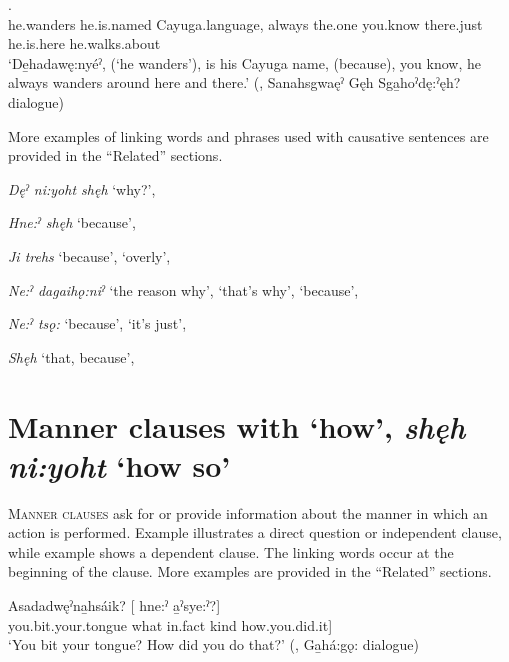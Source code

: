 \ea\label{ex:trehssuborex11} 
.\\
he.wanders he.is.named Cayuga.language, always the.one you.know there.just he.is.here he.walks.about\\
\glt ‘De̱hadawę:nyéˀ, (‘he wanders’), is his Cayuga name, (because), you know, he always wanders around here and there.’ (\cite[317]{mithun_watewayestanih_1984}, Sanahsgwaęˀ Gęh Sga̱hoˀdę:ˀęh? dialogue)
\z

More examples of linking words and phrases used with causative sentences are provided in the “Related” sections.

\begin{CayugaRelated}
\item{}\textit{Dęˀ ni:yoht shęh} ‘why?’, 

\item{}\textit{Hne:ˀ shęh} ‘because’, 

\item{}\textit{Ji trehs} ‘because’, ‘overly’, 

\item{}\textit{Ne:ˀ dagaihǫ:niˀ} ‘the reason why’, ‘that’s why’, ‘because’, 

\item{}\textit{Ne:ˀ tsǫ:} ‘because’, ‘it’s just’, 

\item{}\textit{Shęh} ‘that, because’, 
\end{CayugaRelated}


\section{Manner clauses with  ‘how’, \textit{shęh ni:yoht} ‘how so’} \label{ch:Manner clauses with [dęˀ ni-] ‘how’, [shęh ni:yoht] ‘how so’}
\textsc{Manner clauses} ask for or provide information about the manner in which an action is performed. Example  illustrates a direct question or independent clause, while example  shows a dependent clause. The linking words occur at the beginning of the clause. More examples are provided in the “Related” sections.

\ea\label{ex:mannerclause1} 
\gll Asadadwęˀna̱hsáik? [ hne:ˀ    a̱ˀsye:ˀ?]\\
you.bit.your.tongue what in.fact kind how.you.did.it]\\
\glt ‘You bit your tongue? How did you do that?’ (\cite[386]{mithun_watewayestanih_1984}, Ga̱há:gǫ: dialogue)
\z


